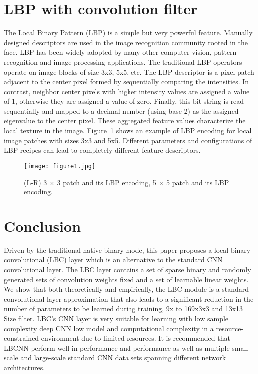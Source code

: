 \documentclass[10pt,twocolumn,letterpaper]{article}
\begin{document}
\section{LBP with convolution filter}
The Local Binary Pattern (LBP) is a simple but very powerful feature. Manually designed descriptors are used in the image recognition community rooted in the face. LBP has been widely adopted by many other computer vision, pattern recognition and image processing applications. The traditional LBP operators\cite{Lin_2014_Network} operate on image blocks of size 3x3, 5x5, etc. The LBP descriptor is a pixel patch adjacent to the center pixel formed by sequentially comparing the intensities. In contrast, neighbor center pixels with higher intensity values ​​are assigned a value of 1, otherwise they are assigned a value of zero. Finally, this bit string is read sequentially and mapped to a decimal number (using base 2) as the assigned eigenvalue to the center pixel. These aggregated feature values ​​characterize the local texture in the image. Figure~\ref{pic1} shows an example of LBP encoding for local image patches with sizes 3x3 and 5x5. Different parameters and configurations of LBP recipes can lead to completely different feature descriptors.
\begin{figure}[htp]
	\centering
	\texttt{[image: figure1.jpg]}
	\caption{  (L-R) 3 × 3 patch and its LBP encoding, 5 × 5 patch and its LBP encoding. }\label{pic1}
\end{figure}
\section{Conclusion}
Driven by the traditional native binary mode, this paper proposes a local binary convolutional (LBC) layer which is an alternative to the standard CNN convolutional layer. The LBC layer contains a set of sparse binary and randomly generated sets of convolution weights fixed and a set of learnable linear weights. We show that both theoretically and empirically, the LBC module is a standard convolutional layer approximation that also leads to a significant reduction in the number of parameters to be learned during training, 9x to 169x3x3 and 13x13 Size filter. LBC's CNN layer is very suitable for learning with low sample complexity deep CNN low model and computational complexity in a resource-constrained environment due to limited resources. It is recommended that LBCNN perform well in performance and performance as well as multiple small-scale and large-scale standard CNN data sets spanning different network architectures.
{\small

}
\end{document}
